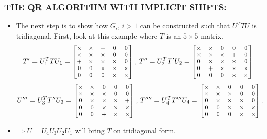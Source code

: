 \documentclass[a4paper,8pt]{beamer} %
\newcommand{\smatrix}[1]{\left[\begin{matrix} #1 \end{matrix}\right]}
\begin{document}
\begin{frame}  %
\frametitle{THE QR ALGORITHM WITH IMPLICIT SHIFTS:}
\begin{itemize}
	\item
	The next step is to show how $G_i,\,i>1$ can be constructed such that $U^TTU$ is tridiagonal.
	First, look at this example where $T$ is an $5\times 5$ matrix.
	\begin{equation}
		\begin{footnotesize}
		T'=U_1 ^T T U_1= 
		\smatrix
		{
			\times 	& \times & + & 0 & 0   \\
			\times 	& \times & \times & 0 & 0   \\
			+   	& \times & \times & \times & 0   \\
			0 & 0 & \times & \times & \times     \\
			0 & 0 & 0 & \times & \times    \\
		}
		,\,
		T''=U_2^T T' U_2 = 
		\smatrix
		{
			\times 	& \times & 0 & 0 & 0   \\
			\times 	& \times & \times & + & 0   \\
			0 	& \times & \times & \times & 0    \\
			0 & + & \times & \times & \times   \\
			0 & 0 & 0 & \times & \times  \\
		}
		\end{footnotesize}
	\end{equation}
	\begin{equation}
		\begin{footnotesize}
		U'''=U_3^T T'' U_3 = 
		\smatrix
		{
			\times 	& \times & 0 & 0 & 0   \\
			\times 	& \times & \times & 0 & 0   \\
			0 	& \times & \times & \times & +\\
			0 & 0 & \times & \times & \times   \\
			0 & 0 & + & \times & \times  \\
		}
		,\,
		T''''=U_4^{T}T'''U_4= 
		\smatrix
		{
			\times 	& \times & 0 & 0 & 0   \\
			\times 	& \times & \times & 0 & 0   \\
			0 	& \times & \times & \times & 0    \\
			0 & 0 & \times & \times & \times   \\
			0 & 0 & 0 & \times & \times  \\
		}
		.
		\end{footnotesize}
	\end{equation}
\item $\Rightarrow U = U_{4}U_{3}U_{2}U_{1}$ will bring $T$ on tridiagonal form.
\end{itemize}
\end{frame}%
\end{document}
